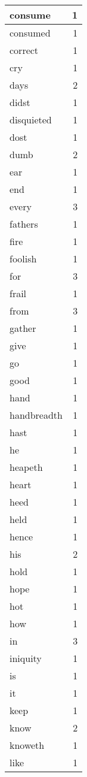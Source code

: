 \begin{center}
\begin{longtable}{l|r}
consume & 1 \\ \hline
consumed & 1 \\ \hline
correct & 1 \\ \hline
cry & 1 \\ \hline
days & 2 \\ \hline
didst & 1 \\ \hline
disquieted & 1 \\ \hline
dost & 1 \\ \hline
dumb & 2 \\ \hline
ear & 1 \\ \hline
end & 1 \\ \hline
every & 3 \\ \hline
fathers & 1 \\ \hline
fire & 1 \\ \hline
foolish & 1 \\ \hline
for & 3 \\ \hline
frail & 1 \\ \hline
from & 3 \\ \hline
gather & 1 \\ \hline
give & 1 \\ \hline
go & 1 \\ \hline
good & 1 \\ \hline
hand & 1 \\ \hline
handbreadth & 1 \\ \hline
hast & 1 \\ \hline
he & 1 \\ \hline
heapeth & 1 \\ \hline
heart & 1 \\ \hline
heed & 1 \\ \hline
held & 1 \\ \hline
hence & 1 \\ \hline
his & 2 \\ \hline
hold & 1 \\ \hline
hope & 1 \\ \hline
hot & 1 \\ \hline
how & 1 \\ \hline
in & 3 \\ \hline
iniquity & 1 \\ \hline
is & 1 \\ \hline
it & 1 \\ \hline
keep & 1 \\ \hline
know & 2 \\ \hline
knoweth & 1 \\ \hline
like & 1 \\ \hline

\end{longtable}
\end{center}
